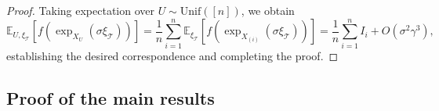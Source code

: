 \documentclass{article}
\newtheorem{cor}{Corollary}[theorem]
\newtheorem{thm}[theorem]{Theorem}
\begin{document}
\begin{proof}
Taking expectation over \(U \sim \mathrm{Unif}([n])\), we obtain
\[
\mathbb{E}_{U, \xi_{\mathcal{T}}}[f(\exp_{X_U}(\sigma \xi_{\mathcal{T}}))] = \frac{1}{n} \sum_{i=1}^n \mathbb{E}_{\xi_{\mathcal{T}}}[f(\exp_{X_{(i)}}(\sigma \xi_{\mathcal{T}}))] = \frac{1}{n} \sum_{i=1}^n I_i + O(\sigma^2\gamma^3),
\]
establishing the desired correspondence and completing the proof.

\end{proof}

\subsection{Proof of the main results}
\label{sec:proofmain}

\end{document}
